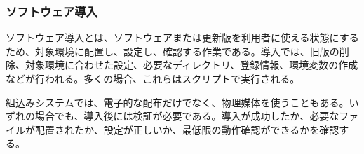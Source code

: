 \subsubsection{ソフトウェア導入}

ソフトウェア導入とは、ソフトウェアまたは更新版を利用者に使える状態にするため、対象環境に配置し、設定し、確認する作業である。導入では、旧版の削除、対象環境に合わせた設定、必要なディレクトリ、登録情報、環境変数の作成などが行われる。多くの場合、これらはスクリプトで実行される。

組込みシステムでは、電子的な配布だけでなく、物理媒体を使うこともある。いずれの場合でも、導入後には検証が必要である。導入が成功したか、必要なファイルが配置されたか、設定が正しいか、最低限の動作確認ができるかを確認する。
